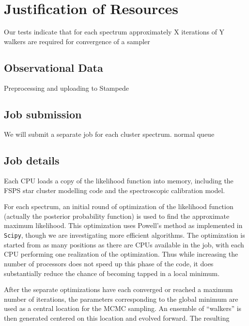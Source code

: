 \documentclass[11pt,preprint]{aastex}
\begin{document}

\section{Justification of Resources}
Our tests indicate that for each spectrum approximately X iterations of Y walkers are required for convergence of a sampler

\subsection{Observational Data}
Preprocessing and uploading to Stampede

\subsection{Job submission}
We will submit a separate job for each cluster spectrum. normal queue

\subsection{Job details}
Each CPU loads a copy of the likelihood function into memory, including the FSPS star cluster modelling code and the spectroscopic calibration model.

For each spectrum, an initial round of optimization of the likelihood function (actually the posterior probability function) is used to find the approximate maximum likelihood. 
This optimization uses Powell's method as implemented in \texttt{Scipy}, though we are investigating more efficient algorithms. 
The optimization is started from as many positions as there are CPUs available in the job, with each CPU  performing one realization of the optimization.  
Thus while increasing the number of processors does not speed up this phase of the code, it does substantially reduce the chance of becoming tapped in a local minimum.

After the separate optimizations have each converged or reached a maximum number of iterations, the parameters corresponding to the global minimum are used as a central location for the MCMC sampling.
An ensemble of ``walkers'' is then generated centered on this location and evolved forward.  
The resulting 
\end{document}
